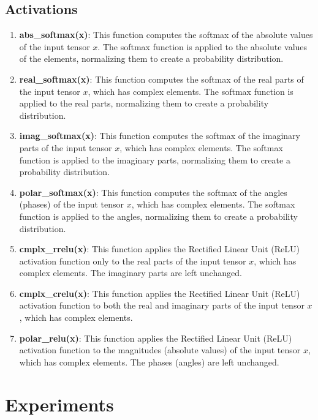 \documentclass{article}
\begin{document}
\subsection{Activations}
\begin{enumerate}
  \item \textbf{abs\_softmax(x)}: This function computes the softmax of the absolute values of the input tensor $x$. The softmax function is applied to the absolute values of the elements, normalizing them to create a probability distribution.

  \item \textbf{real\_softmax(x)}: This function computes the softmax of the real parts of the input tensor $x$, which has complex elements. The softmax function is applied to the real parts, normalizing them to create a probability distribution.

  \item \textbf{imag\_softmax(x)}: This function computes the softmax of the imaginary parts of the input tensor $x$, which has complex elements. The softmax function is applied to the imaginary parts, normalizing them to create a probability distribution.

  \item \textbf{polar\_softmax(x)}: This function computes the softmax of the angles (phases) of the input tensor $x$, which has complex elements. The softmax function is applied to the angles, normalizing them to create a probability distribution.

  \item \textbf{cmplx\_rrelu(x)}: This function applies the Rectified Linear Unit (ReLU) activation function only to the real parts of the input tensor $x$, which has complex elements. The imaginary parts are left unchanged.

  \item \textbf{cmplx\_crelu(x)}: This function applies the Rectified Linear Unit (ReLU) activation function to both the real and imaginary parts of the input tensor $x$, which has complex elements.

  \item \textbf{polar\_relu(x)}: This function applies the Rectified Linear Unit (ReLU) activation function to the magnitudes (absolute values) of the input tensor $x$, which has complex elements. The phases (angles) are left unchanged.
\end{enumerate}

\section{Experiments}
\end{document}
